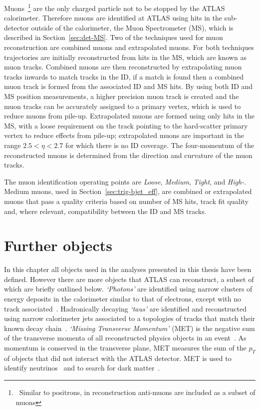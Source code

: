 Muons~\footnote{\ Similar to positrons, in reconstruction anti-muons are included as a subset of muons}
are the only charged particle not to be stopped by the ATLAS calorimeter.
Therefore muons are identified at ATLAS using hits in the sub-detector outside of the calorimeter, the Muon Spectrometer (MS), which is described in Section~\ref{sec:det-MS}.
Two of the techniques used for muon reconstruction are combined muons and extrapolated muons.
For both techniques trajectories are initially reconstructed from hits in the MS, which are known as muon tracks.
Combined muons are then reconstructed by extrapolating muon tracks inwards to match tracks in the ID,
if a match is found then a combined muon track is formed from the associated ID and MS hits.
By using both ID and MS position measurements, a higher precision muon track is created
and the muon tracks can be accurately assigned to a primary vertex, which is used to reduce muons from pile-up.
Extrapolated muons are formed using only hits in the MS,
with a loose requirement on the track pointing to the hard-scatter primary vertex to reduce effects from pile-up;
extrapolated muons are important in the range $2.5 < \eta < 2.7$ for which there is no ID coverage.
The four-momentum of the reconstructed muons is determined from the direction and curvature of the muon tracks.

The muon identification operating points are \textit{Loose}, \textit{Medium}, \textit{Tight}, and \textit{High-\pT{}}.
Medium muons, used in Section~\ref{sec:trig-bjet_eff}, are combined or extrapolated muons that pass a quality criteria based on
number of MS hits, track fit quality and, where relevant, compatibility between the ID and MS tracks.

\section{Further objects}
\label{sec:obj-further}

In this chapter all objects used in the analyses presented in this thesis have been defined.
However there are more objects that ATLAS can reconstruct, a subset of which are briefly outlined below.
\textit{`Photons'} are identified using narrow clusters of energy deposits in the calorimeter similar to that of electrons,
  except with no track associated~\cite{obj-photons}. %
 Hadronically decaying \textit{`taus'} are identified and reconstructed using narrow calorimeter jets
 associated to a topologies of tracks that match their known decay chain~\cite{obj-taus}.
 \textit{`Missing Transverse Momentum'} (MET) is the negative sum of the transverse momenta of all reconstructed physics objects in an event~\cite{obj-met}.
 As momentum is conserved in the transverse plane, MET measures the sum of the $p_T$ of objects that did not interact with the ATLAS detector.
  MET is used to identify neutrinos~\cite{obj-Hbb} and to search for dark matter~\cite{obj-met_monoJet}.
